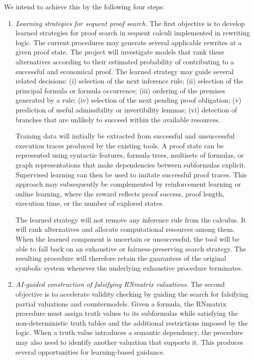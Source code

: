 \documentclass[a4paper]{article}
\begin{document}
We intend to achieve this by the following four steps:
\begin{enumerate}
\item {\em Learning strategies for sequent proof search.}
The first objective is to develop learned strategies for proof search in sequent calculi implemented in rewriting logic.
%
The current procedures may generate several applicable rewrites at a given proof state. The project will investigate models that rank these alternatives according to their estimated probability of contributing to a successful and economical proof. The learned strategy may guide several related decisions: (i) selection of the next inference rule; (ii) selection of the principal formula or formula occurrence; (iii) ordering of the premises generated by a rule; (iv) selection of the next pending proof obligation; (v) prediction of useful admissibility or invertibility lemmas; (vi) detection of branches that are unlikely to succeed within the available resources.

Training data will initially be extracted from successful and unsuccessful execution traces produced by the existing tools. A proof state can be represented using syntactic features, formula trees, multisets of formulas, or graph representations that make dependencies between subformulas explicit. Supervised learning can then be used to imitate successful proof traces. This approach may subsequently be complemented by reinforcement learning or online learning, where the reward reflects proof success, proof length, execution time, or the number of explored states.

The learned strategy will not remove any inference rule from the calculus. It will rank alternatives and allocate computational resources among them. When the learned component is uncertain or unsuccessful, the tool will be able to fall back on an exhaustive or fairness-preserving search strategy. The resulting procedure will therefore retain the guarantees of the original symbolic system whenever the underlying exhaustive procedure terminates.

\item  {\em AI-guided construction of falsifying RNmatrix valuations.}
The second objective is to accelerate validity checking by guiding the search for falsifying partial valuations and countermodels.
%
Given a formula, the RNmatrix procedure must assign truth values to its subformulas while satisfying the non-deterministic truth tables and the additional restrictions imposed by the logic. When a truth value introduces a semantic dependency, the procedure may also need to identify another valuation that supports it. This produces several opportunities for learning-based guidance.


\end{enumerate}
\end{document}
